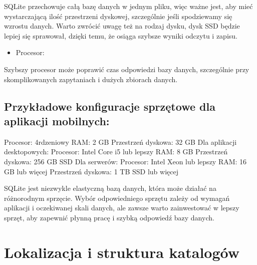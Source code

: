 \documentclass[letterpaper,10pt,polish]{sphinxmanual}
\begin{document}
\sphinxAtStartPar
SQLite przechowuje całą bazę danych w jednym pliku, więc ważne jest, aby mieć wystarczającą ilość przestrzeni dyskowej, szczególnie jeśli spodziewamy się wzrostu danych. Warto zwrócić uwagę też na rodzaj dysku, dysk SSD będzie lepiej się sprawował, dzięki temu, że osiąga szybsze wyniki odczytu i zapisu.
\begin{itemize}
\item {} 
\sphinxAtStartPar
Procesor:

\end{itemize}

\sphinxAtStartPar
Szybszy procesor może poprawić czas odpowiedzi bazy danych, szczególnie przy skomplikowanych zapytaniach i dużych zbiorach danych.


\section{Przykładowe konfiguracje sprzętowe dla aplikacji mobilnych:}
\label{\detokenize{DB-Report/Bazy Danych Rozdzia_u0142 1/Pod_rozdzia_u0142_2:przykladowe-konfiguracje-sprzetowe-dla-aplikacji-mobilnych}}
\sphinxAtStartPar
Procesor: 4\sphinxhyphen{}rdzeniowy
RAM: 2 GB
Przestrzeń dyskowa: 32 GB
Dla aplikacji desktopowych:
Procesor: Intel Core i5 lub lepszy
RAM: 8 GB
Przestrzeń dyskowa: 256 GB SSD
Dla serwerów:
Procesor: Intel Xeon lub lepszy
RAM: 16 GB lub więcej
Przestrzeń dyskowa: 1 TB SSD lub więcej

\sphinxAtStartPar
SQLite jest niezwykle elastyczną bazą danych, która może działać na różnorodnym sprzęcie. Wybór odpowiedniego sprzętu zależy od wymagań aplikacji i oczekiwanej skali danych, ale zawsze warto zainwestować w lepszy sprzęt, aby zapewnić płynną pracę i szybką odpowiedź bazy danych.

\sphinxstepscope


\chapter{Lokalizacja i struktura katalogów}
\label{\detokenize{DB-Konfiguracja-bazy-danych/source/rozdzialy/rozdzial1:lokalizacja-i-struktura-katalogow}}\label{\detokenize{DB-Konfiguracja-bazy-danych/source/rozdzialy/rozdzial1::doc}}
\end{document}
